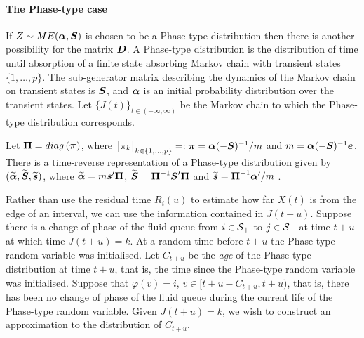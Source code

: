 \paragraph{The Phase-type case}
If \(Z\sim ME(\boldsymbol \alpha, \boldsymbol S)\) is chosen to be a Phase-type distribution then there is another possibility for the matrix \(\boldsymbol D\). A Phase-type distribution is the distribution of time until absorption of a finite state absorbing Markov chain with transient states \(\{1,\dots,p\}.\) The sub-generator matrix describing the dynamics of the Markov chain on transient states is \(\boldsymbol S\), and \(\boldsymbol \alpha\) is an initial probability distribution over the transient states. Let \(\{J(t)\}_{t\in (-\infty,\infty)}\) be the Markov chain to which the Phase-type distribution corresponds. 

Let \(\boldsymbol \Pi = diag\left(\boldsymbol \pi \right)\), where \(\begin{bmatrix} \pi_k \end{bmatrix}_{k\in\{1,\dots,p\}}=:\boldsymbol \pi=\boldsymbol \alpha (-\boldsymbol{S})^{-1}/m\) and \(m=\boldsymbol \alpha (-\boldsymbol{S})^{-1}\boldsymbol e\). There is a time-reverse representation of a Phase-type distribution given by \((\widetilde{\boldsymbol \alpha}, \widetilde{\boldsymbol S}, \widetilde{\boldsymbol s})\), where \(\widetilde{\boldsymbol \alpha} = m\boldsymbol s' \boldsymbol \Pi \), \(\widetilde{\boldsymbol S} = \boldsymbol\Pi^{-1}\boldsymbol S'\boldsymbol \Pi\) and \(\widetilde{\boldsymbol s} = \boldsymbol \Pi^{-1}\boldsymbol \alpha'/m\) \cite[Page 91]{a2008}.

Rather than use the residual time \(R_i(u)\) to estimate how far \(X(t)\) is from the edge of an interval, we can use the information contained in \(J(t+u)\). Suppose there is a change of phase of the fluid queue from \(i\in\mathcal{S}_+\) to \(j\in\mathcal{S}_-\) at time \(t+u\) at which time \(J(t+u)=k\). At a random time before \(t+u\) the Phase-type random variable was initialised. Let \(C_{t+u}\) be the \emph{age} of the Phase-type distribution at time \(t+u\), that is, the time since the Phase-type random variable was initialised. Suppose that \(\varphi(v)=i\), \(v\in [t+u-C_{t+u}, t+u)\), that is, there has been no change of phase of the fluid queue during the current life of the Phase-type random variable. Given \(J(t+u)=k\), we wish to construct an approximation to the distribution of \(C_{t+u}\). 

